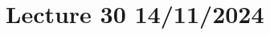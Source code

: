 \documentclass[fleqn,10pt]{SelfArx} %
\begin{document}
%
\clearpage

\section{Lecture 30 14/11/2024}
\end{document}
